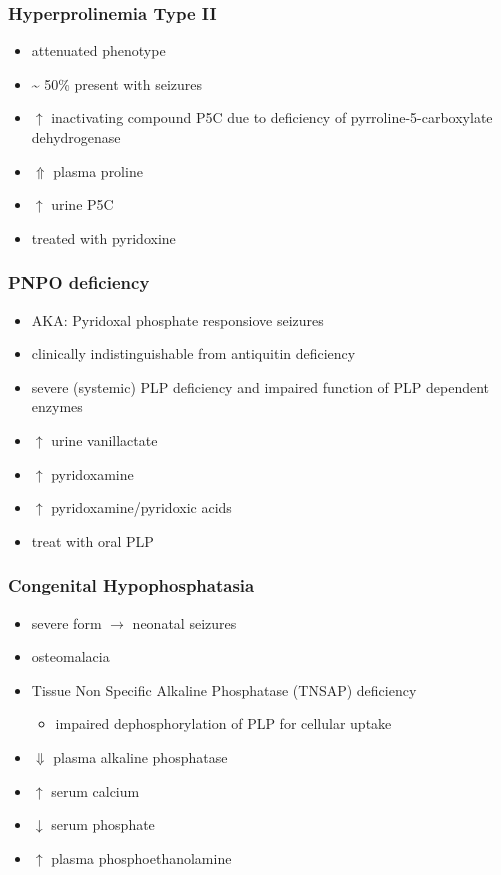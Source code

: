 \documentclass{scrartcl}
\begin{document}
\subsubsection{Hyperprolinemia Type II}
\label{sec:org45ae878}
\begin{itemize}
\item attenuated phenotype
\item \textasciitilde{} 50\% present with seizures
\item \(\uparrow\) inactivating compound P5C due to deficiency of pyrroline-5-carboxylate dehydrogenase
\item \(\Uparrow\) plasma proline
\item \(\uparrow\) urine P5C
\item treated with pyridoxine
\end{itemize}

\subsubsection{PNPO deficiency}
\label{sec:org9d57bc9}
\begin{itemize}
\item AKA: Pyridoxal phosphate responsiove seizures
\item clinically indistinguishable from antiquitin deficiency
\item severe (systemic) PLP deficiency and impaired function of PLP
dependent enzymes
\item \(\uparrow\) urine vanillactate
\item \(\uparrow\) pyridoxamine
\item \(\uparrow\) pyridoxamine/pyridoxic acids
\item treat with oral PLP
\end{itemize}

\subsubsection{Congenital Hypophosphatasia}
\label{sec:org04591e0}
\begin{itemize}
\item severe form \(\to\) neonatal seizures
\item osteomalacia
\item Tissue Non Specific Alkaline Phosphatase (TNSAP) deficiency
\begin{itemize}
\item impaired dephosphorylation of PLP for cellular uptake
\end{itemize}
\item \(\Downarrow\) plasma alkaline phosphatase
\item \(\uparrow\) serum calcium
\item \(\downarrow\) serum phosphate
\item \(\uparrow\) plasma phosphoethanolamine
\end{itemize}
\end{document}
